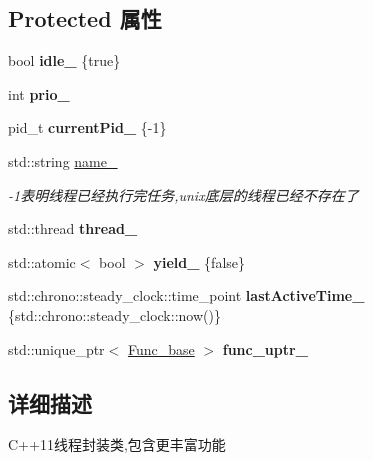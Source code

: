 \subsection*{Protected 属性}
\begin{DoxyCompactItemize}
\item 
\mbox{\label{classThread_a23541f34356cb161bb5fe6026bb3000a}} 
bool {\bfseries idle\+\_\+} \{true\}
\item 
\mbox{\label{classThread_ada8c342b34fb001cfcf57619b7150840}} 
int {\bfseries prio\+\_\+}
\item 
\mbox{\label{classThread_a0c0878a96696bbb092a69bc2f1f812fd}} 
pid\+\_\+t {\bfseries current\+Pid\+\_\+} \{-\/1\}
\item 
\mbox{\label{classThread_aa222eb32e5fc8f386d9fb018607acd9c}} 
std\+::string \hyperlink{classThread_aa222eb32e5fc8f386d9fb018607acd9c}{name\+\_\+}
\begin{DoxyCompactList}\small\item\em -\/1表明线程已经执行完任务,unix底层的线程已经不存在了 \end{DoxyCompactList}\item 
\mbox{\label{classThread_ad313ba812a7875c743dd0d37d565acfb}} 
std\+::thread {\bfseries thread\+\_\+}
\item 
\mbox{\label{classThread_ae8ebc3f208496db3052de7a56eb6e895}} 
std\+::atomic$<$ bool $>$ {\bfseries yield\+\_\+} \{false\}
\item 
\mbox{\label{classThread_ae7ed71c6b1f7782ecd4186005fd70760}} 
std\+::chrono\+::steady\+\_\+clock\+::time\+\_\+point {\bfseries last\+Active\+Time\+\_\+} \{std\+::chrono\+::steady\+\_\+clock\+::now()\}
\item 
\mbox{\label{classThread_a677202a7d90ebc5a6d4f8b1eab1a1eac}} 
std\+::unique\+\_\+ptr$<$ \hyperlink{structThread_1_1Func__base}{Func\+\_\+base} $>$ {\bfseries func\+\_\+uptr\+\_\+}
\end{DoxyCompactItemize}


\subsection{详细描述}
C++11线程封装类,包含更丰富功能 

